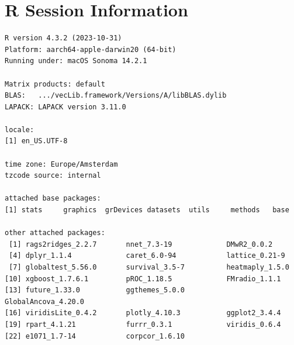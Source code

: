 \documentclass{amsart}
\begin{document}
\section{R Session Information} \label{appendixB}

\begin{verbatim}
R version 4.3.2 (2023-10-31)
Platform: aarch64-apple-darwin20 (64-bit)
Running under: macOS Sonoma 14.2.1

Matrix products: default
BLAS:   .../vecLib.framework/Versions/A/libBLAS.dylib 
LAPACK: LAPACK version 3.11.0

locale:
[1] en_US.UTF-8

time zone: Europe/Amsterdam
tzcode source: internal

attached base packages:
[1] stats     graphics  grDevices datasets  utils     methods   base     

other attached packages:
 [1] rags2ridges_2.2.7       nnet_7.3-19             DMwR2_0.0.2                       
 [4] dplyr_1.1.4             caret_6.0-94            lattice_0.21-9                    
 [7] globaltest_5.56.0       survival_3.5-7          heatmaply_1.5.0               
[10] xgboost_1.7.6.1         pROC_1.18.5             FMradio_1.1.1       
[13] future_1.33.0           ggthemes_5.0.0          GlobalAncova_4.20.0 
[16] viridisLite_0.4.2       plotly_4.10.3           ggplot2_3.4.4
[19] rpart_4.1.21            furrr_0.3.1             viridis_0.6.4 
[22] e1071_1.7-14            corpcor_1.6.10


\end{verbatim}
\end{document}
